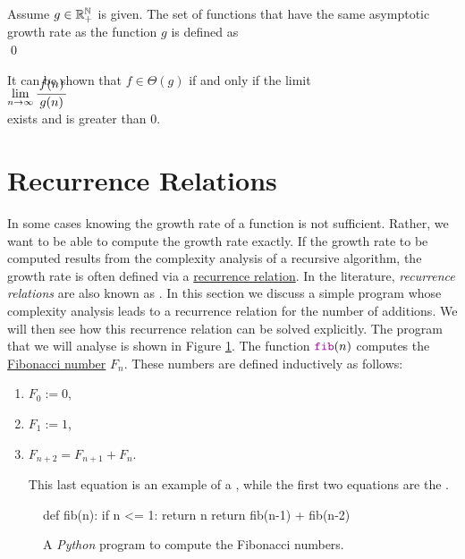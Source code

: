 \begin{Definition}[$\Theta(g)$] 
  Assume $g \in {\mathbb R}_+^{{\mathbb N}}$ is given.   The set of functions that have the same asymptotic growth rate
  as the function $g$ is defined as
  \\[0.2cm]
  \hspace*{0.5cm} 
  \colorbox{red}{}
  \qed 
\end{Definition}

\noindent
It can be shown that $f \in \Theta(g)$ if and only if the limit
\\[0.4cm]
\hspace*{1.3cm}
$\lim\limits_{n \rightarrow \infty} \bruch{f(n)}{g(n)}$
\\[0.2cm]
exists and is greater than $0$.

\section{Recurrence Relations}
In some cases knowing the growth rate of a function is not sufficient.  Rather, we want to be able to compute
the growth rate exactly.  If the growth rate to be computed results from the complexity analysis of a recursive
algorithm, the growth rate is often defined via a
\href{https://en.wikipedia.org/wiki/Recurrence_relation}{recurrence relation}.  In the literature,
\emph{recurrence relations} are also known as .
In this section we discuss a simple program whose complexity analysis leads to a recurrence relation for the 
number of additions.  We will then see how this recurrence relation can be solved explicitly.  The program that
we will analyse is shown in Figure \ref{fig:Fibonacci.ipynb}.  The function $\mytt{fib}(n)$ computes the
\href{https://en.wikipedia.org/wiki/Fibonacci_number}{Fibonacci number}  $F_n$.  These
numbers are defined inductively as follows:
\begin{enumerate}
\item $F_0 := 0$,
\item $F_1 := 1$, 
\item $F_{n+2} = F_{n+1} + F_n$.

  This last equation is an example of a , while the first two equations are the
  . 
\end{enumerate}

\begin{figure}[!h]
  \centering
\begin{python3code} 
    def fib(n):
        if n <= 1:
            return n
        return fib(n-1) + fib(n-2)
\end{python3code}
\vspace*{-0.7cm}
  \caption{A \textsl{Python} program to compute the Fibonacci numbers.}
  \label{fig:Fibonacci.ipynb}
\end{figure} 

